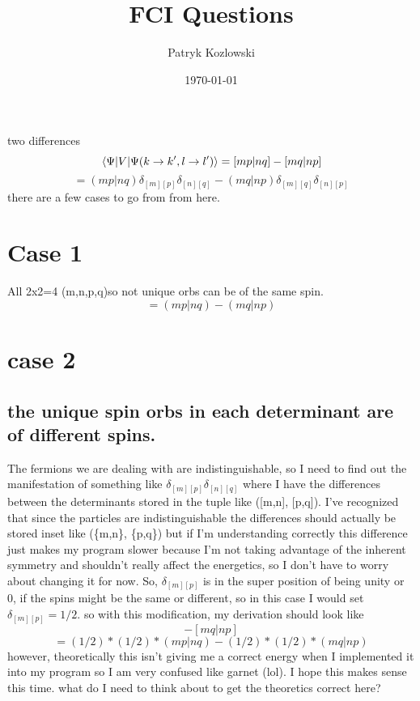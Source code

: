 \documentclass[12pt]{article}
\title{FCI Questions}
\author{Patryk Kozlowski}
\date{\today}
\begin{document}
\maketitle
two differences
\begin{equation}
    \mel{\Psi }{V}{\Psi (k\rightarrow k^{\prime}, l\rightarrow l^{\prime})}
    =[mp|nq]-[mq|np]
\end{equation}
\begin{equation}
    =(mp|nq)\delta _{[m][p]}\delta _{[n][q]}-(mq|np)\delta _{[m][q]}\delta _{[n][p]}
\end{equation}
 there are a few cases to go from from here.
\section{Case 1}
All 2x2=4 (m,n,p,q)so not unique orbs can be of the same spin.
\begin{equation}
    =(mp|nq)-(mq|np)
\end{equation}
\section{case 2}
\subsection{the unique spin orbs in each determinant are of different spins.}

The fermions we are dealing with are indistinguishable, so I need to find out the manifestation of something like $\delta _{[m][p]}\delta _{[n][q]}$ where I have the differences between the determinants stored in the tuple like ([m,n], [p,q]). I've recognized that since the particles are indistinguishable the differences should actually be stored inset like (\{m,n\}, \{p,q\}) but if I'm understanding correctly this difference just makes my program slower because I'm not taking advantage of the inherent symmetry and shouldn't really affect the energetics, so I don't have to worry about changing it for now.
So, $\delta _{[m][p]}$ is in the super position of being unity or 0, if the spins might be the same or different, so in this case I would set $\delta _{[m][p]}=1/2$. so with this modification, my derivation should look like
\begin{equation}
    [mp|nq]-[mq|np]
\end{equation}
\begin{equation}
    =(1/2)*(1/2)*(mp|nq)-(1/2)*(1/2)*(mq|np)
\end{equation}
however, theoretically this isn't giving me a correct energy when I implemented it into my program so I am very confused like garnet (lol). I hope this makes sense this time. what do I need to think about to get the theoretics correct here?
\end{document}
